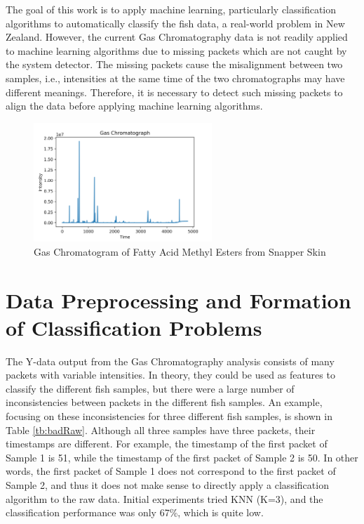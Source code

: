 \documentclass[runningheads]{llncs}
\begin{document}
The goal of this work is to apply machine learning, particularly classification algorithms to automatically classify the fish data, a real-world problem in New Zealand. 
However, the current Gas Chromatography data is not readily applied to machine learning algorithms due to missing packets which are not caught by the system detector. 
The missing packets cause the misalignment between two samples, i.e., intensities at the same time of the two chromatographs may have different meanings. 
Therefore, it is necessary to detect such missing packets to align the data before applying machine learning algorithms. 

\begin{figure}[t]
  \centering
  \includegraphics[width=0.6\textwidth]{chromatograph.png}
  
  \caption{Gas Chromatogram of Fatty Acid Methyl Esters from Snapper Skin}
  \label{fig:gas-chromatography}
\end{figure}

\section{Data Preprocessing and Formation of Classification Problems}

The Y-data output from the Gas Chromatography analysis consists of many packets with variable intensities. 
In theory, they could be used as features to classify the different fish samples, but there were a large number of inconsistencies between packets in the different fish samples. 
An example, focusing on these inconsistencies for three different fish samples, is shown in Table \ref{tb:badRaw}. 
Although all three samples have three packets, their timestamps are different. 
For example, the timestamp of the first packet of Sample 1 is 51, while the timestamp of the first packet of Sample 2 is 50. 
In other words, the first packet of Sample 1 does not correspond to the first packet of Sample 2, and thus it does not make sense to directly apply a classification algorithm to the raw data. 
Initial experiments tried KNN (K=3), and the classification performance was only 67\%, which is quite low. 
\end{document}

